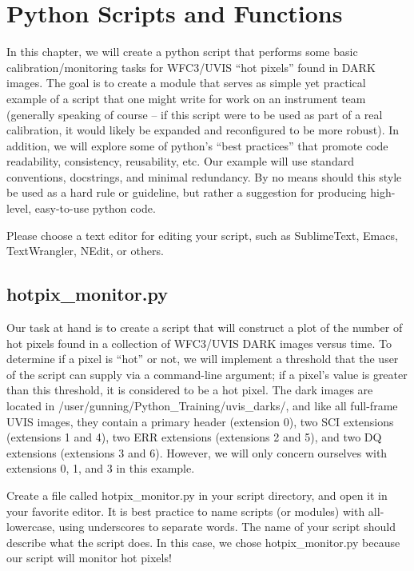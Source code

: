 \chapter{Python Scripts and Functions}
\label{ch:scripts}

In this chapter, we will create a python script that performs some
basic calibration/monitoring tasks for WFC3/UVIS ``hot pixels'' found in
DARK images.  The goal is to create a module that serves as simple yet
practical example of a script that one might write for work on an instrument
team (generally speaking of course -- if this script were to be used as part
of a real calibration, it would likely be expanded and reconfigured to be
more robust).  In addition, we will explore some of python's ``best practices'' that
promote code readability, consistency, reusability, etc.  Our example will use standard 
conventions, docstrings, and minimal redundancy.  By no means should this style be used as
a hard rule or guideline, but rather a suggestion for producing high-level,
easy-to-use python code.

Please choose a text editor for editing your script, such as SublimeText, Emacs, TextWrangler, 
NEdit, or others.
 
\section{hotpix\_monitor.py}

Our task at hand is to create a script that will construct a plot of the number 
of hot pixels found in a collection of WFC3/UVIS DARK images versus time. To determine if a pixel 
is ``hot'' or not, we will implement a threshold that the user of the script can 
supply via a command-line argument; if a pixel's value is greater than this threshold, 
it is considered to be a hot pixel.  The dark images are located in 
/user/gunning/Python\_Training/uvis\_darks/, and like all full-frame UVIS images, they contain 
a primary header (extension 0), two SCI extensions (extensions 1 and 4), two ERR extensions
(extensions 2 and 5), and two DQ extensions (extensions 3 and 6).  However, we will only 
concern ourselves with extensions 0, 1, and 3 in this example.

Create a file called {\sf\small hotpix\_monitor.py} in your script directory, and
open it in your favorite editor.  It is best practice to name scripts (or modules) 
with all-lowercase, using underscores to separate words.  The name of your script
should describe what the script does.  In this case, we chose {\sf\small hotpix\_monitor.py}
because our script will monitor hot pixels!

